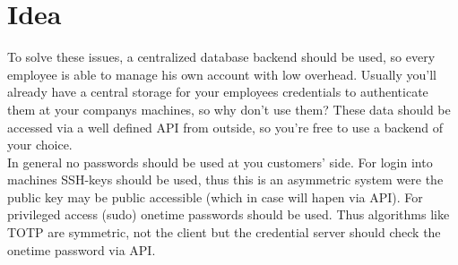 %
%
%
%
%
%
%


\section{Idea}

To solve these issues, a centralized database backend should be used, so every
employee is able to manage his own account with low overhead. Usually you'll
already have a central storage for your employees credentials to authenticate
them at your companys machines, so why don't use them? These data should be
accessed via a well defined API from outside, so you're free to use a backend of
your choice. \\

In general no passwords should be used at you customers' side. For login into
machines SSH-keys should be used, thus this is an asymmetric system were the
public key may be public accessible (which in case will hapen via API). For
privileged access (sudo) onetime passwords should be used. Thus algorithms like
TOTP are symmetric, not the client but the credential server should check the
onetime password via API.
